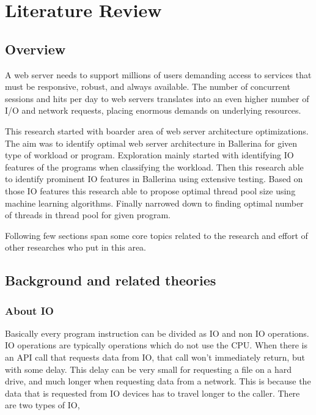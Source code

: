 \chapter{Literature Review}

\section{Overview}

A web server needs to support millions of users demanding access to services that must be responsive,
robust, and always available. The number of concurrent sessions and hits per day to web servers
translates into an even higher number of I/O and network requests, placing enormous demands on
underlying resources. 

This research started with boarder area of web server architecture optimizations. The aim was to identify optimal web server architecture in Ballerina for given type of workload or program. Exploration mainly started with identifying IO features of the programs when classifying the workload. Then this research able to identify prominent IO features in Ballerina using extensive testing. Based on those IO features this research able to propose optimal thread pool size using machine learning algorithms. Finally narrowed down to finding optimal number of threads in thread pool for given program.

Following few sections span some core topics related to the research and effort of other researches who put in this area.

\section{Background and related theories}

\subsection{About IO}

Basically every program instruction can be divided as IO and non IO operations. IO operations are
typically operations which do not use the CPU. When there is an API call that requests data from IO,
that call won’t immediately return, but with some delay. \cite{nb_algo} This delay can be very small for
requesting a file on a hard drive, and much longer when requesting data from a network. This is
because the data that is requested from IO devices has to travel longer to the caller.
There are two types of IO,

